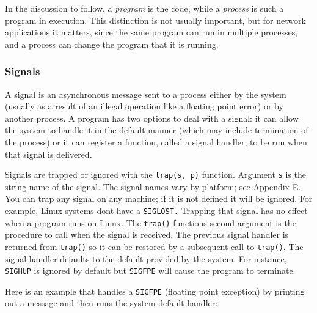 In the discussion to follow, a \textit{program} is the code, while
a \textit{process} is such
a program in execution. This distinction is not usually important, but
for network applications it matters,
since the same program can run in multiple processes, and a process can
change the program that it is running.

\subsubsection{Signals}

A signal is an asynchronous message sent to a process
either by the system (usually as a result of an illegal operation like
a floating point error) or by another
process. A program has two options to deal with a signal: it can allow
the system to handle it in the default manner (which may include
termination of the process) or it can register a function, called a
signal handler, to be run when that signal is delivered.

Signals are trapped or ignored with the \texttt{trap(s, p)} function.
Argument \texttt{s} is the string name of the signal. The signal names
vary by platform; see Appendix E. You can trap any signal on any
machine; if it is not defined it will be ignored. For example, Linux
systems don{\textquotesingle}t have a \texttt{SIGLOST.} Trapping that
signal has no effect when a program runs on Linux. The \texttt{trap()}
function{\textquotesingle}s second argument is the procedure to call
when the signal is received. The previous signal handler is returned
from \texttt{trap()} so it can be restored by a
subsequent call to \texttt{trap()}. The signal handler defaults to the
default provided by the system. For instance, \texttt{SIGHUP} is
ignored by default but \texttt{SIGFPE} will cause the program to
terminate.

Here is an example that handles a \texttt{SIGFPE} (floating point
exception) by printing out a message and then runs the system default
handler:


